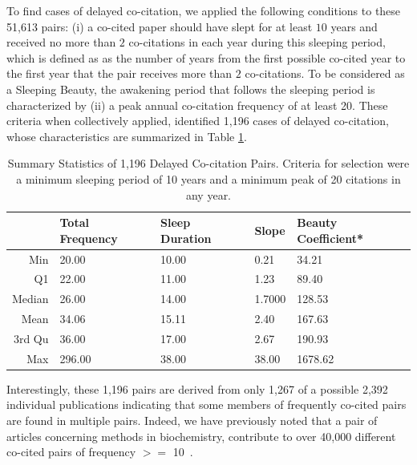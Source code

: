 \documentclass[11pt, oneside]{article}   	%
\begin{document}
To find cases of delayed co-citation, we applied the following conditions to these 51,613 pairs: (i)  a co-cited paper should have slept for at least $10$ years and received no more than $2$ co-citations in each year during this sleeping period, which is defined as as the number of years from the first possible co-cited year to the first year that the pair receives more than $2$ co-citations. To be considered as a Sleeping Beauty, the awakening period that follows the sleeping period is characterized by (ii) a peak annual co-citation frequency of at least 20. These criteria when collectively applied, identified 1,196 cases of delayed co-citation, whose characteristics are summarized in Table \ref{tab:table2}. 

\begin{table}[ht]
\caption{Summary Statistics of 1,196 Delayed Co-citation Pairs. Criteria for selection were a minimum sleeping period of 10 years and a minimum peak of 20 citations in any year.}%
\centering %
\begin{center}
\begin{tabular}{rllll} 
& Total Frequency & Sleep Duration & Slope & Beauty Coefficient* \\
\hline %
Min &  20.00 & 10.00 & 0.21 & 34.21   \\ 
Q1  &  22.00 & 11.00  & 1.23 & 89.40   \\ 
Median & 26.00 & 14.00 & 1.7000 & 128.53   \\ 
Mean & 34.06 & 15.11 & 2.40 & 167.63   \\ 
3rd Qu & 36.00 & 17.00 & 2.67 & 190.93   \\ 
Max & 296.00 & 38.00  & 38.00  & 1678.62   \\ 
\hline
\end{tabular}
\end{center}
\label{tab:table2} %
\end{table}

Interestingly, these 1,196 pairs are derived from only 1,267 of a possible 2,392 individual publications indicating that some members of frequently co-cited pairs are found in multiple pairs. Indeed, we have previously noted that a pair of articles concerning methods in biochemistry, contribute to over 40,000 different co-cited pairs of frequency $>=$ 10~\citep{devarakonda_2020}.  
\end{document}
